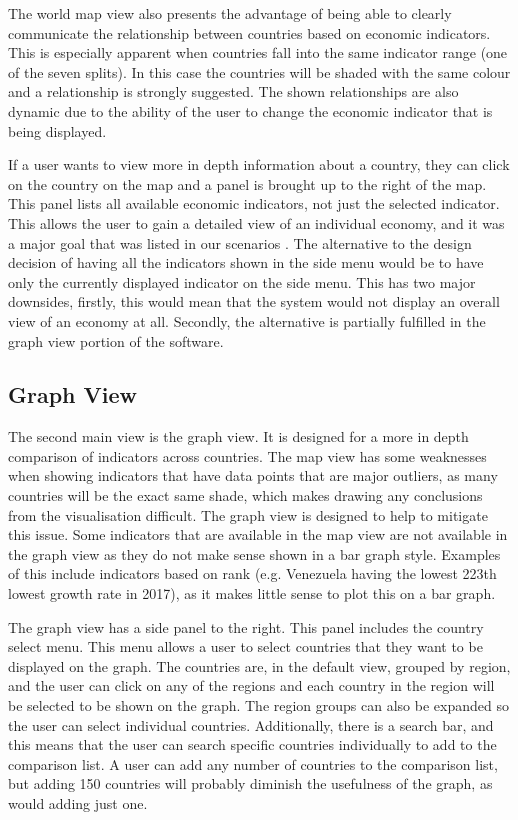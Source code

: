 \documentclass[10pt, journal]{IEEEtran}
\begin{document}
The world map view also presents the advantage of being able to clearly communicate the relationship between countries based on economic indicators. This is especially apparent when countries fall into the same indicator range (one of the seven splits). In this case the countries will be shaded with the same colour and a relationship is strongly suggested. The shown relationships are also dynamic due to the ability of the user to change the economic indicator that is being displayed.

If a user wants to view more in depth information about a country, they can click on the country on the map and a panel is brought up to the right of the map. This panel lists all available economic indicators, not just the selected indicator. This allows the user to gain a detailed view of an individual economy, and it was a major goal that was listed in our scenarios \cite{scenarios}. The alternative to the design decision of having all the indicators shown in the side menu would be to have only the currently displayed indicator on the side menu. This has two major downsides, firstly, this would mean that the system would not display an overall view of an economy at all. Secondly, the alternative is partially fulfilled in the graph view portion of the software.

\subsection{Graph View}

The second main view is the graph view. It is designed for a more in depth comparison of indicators across countries. The map view has some weaknesses when showing indicators that have data points that are major outliers, as many countries will be the exact same shade, which makes drawing any conclusions from the visualisation difficult. The graph view is designed to help to mitigate this issue. Some indicators that are available in the map view are not available in the graph view as they do not make sense shown in a bar graph style. Examples of this include indicators based on rank (e.g. Venezuela having the lowest 223th lowest growth rate in 2017), as it makes little sense to plot this on a bar graph. 

The graph view has a side panel to the right. This panel includes the country select menu. This menu allows a user to select countries that they want to be displayed on the graph. The countries are, in the default view, grouped by region, and the user can click on any of the regions and each country in the region will be selected to be shown on the graph. The region groups can also be expanded so the user can select individual countries. Additionally, there is a search bar, and this means that the user can search specific countries individually to add to the comparison list. A user can add any number of countries to the comparison list, but adding 150 countries will probably diminish the usefulness of the graph, as would adding just one.
\end{document}
